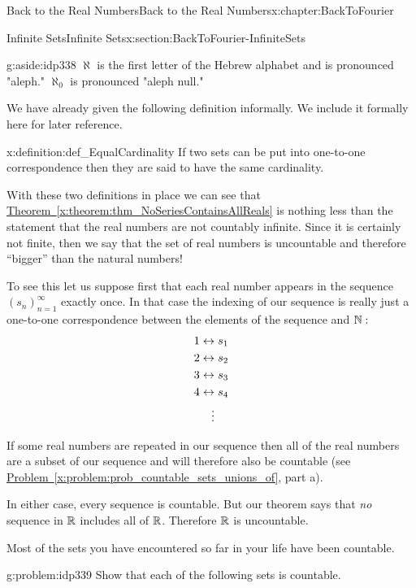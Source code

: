 \begin{chapterptx}{Back to the Real Numbers}{}{Back to the Real Numbers}{}{}{x:chapter:BackToFourier}
\begin{sectionptx}{Infinite Sets}{}{Infinite Sets}{}{}{x:section:BackToFourier-InfiniteSets}
		\begin{aside}{}{g:aside:idp338}%
			\(\aleph{}\) is the first letter of the Hebrew alphabet and is pronounced "aleph." \(\aleph_0\) is pronounced "aleph null."%
		\end{aside}
		We have already given the following definition informally. We include it formally here for later reference.%
		\begin{definition}{}{x:definition:def_EqualCardinality}%
			 If two sets can be put into one-to-one correspondence then they are said to have the \alert{same cardinality}.%
		\end{definition}
		With these two definitions in place we can see that \hyperref[x:theorem:thm_NoSeriesContainsAllReals]{Theorem~{\xreffont\ref{x:theorem:thm_NoSeriesContainsAllReals}}} is nothing less than the statement that the real numbers are not countably infinite. Since it is certainly not finite, then we say that the set of real numbers is uncountable and therefore ``bigger'' than the natural numbers!%
		\par
		To see this let us suppose first that each real number appears in the sequence \((s_n)_{n=1}^\infty\) exactly once. In that case the indexing of our sequence is really just a one-to-one correspondence between the elements of the sequence and \(\mathbb {N}:\)%
		\begin{align*}
			1& \leftrightarrow s_1\\
			2& \leftrightarrow s_2\\
			3& \leftrightarrow s_3\\
			4& \leftrightarrow s_4\\
			& \ \ \ \vdots
		\end{align*}
		\par
		If some real numbers are repeated in our sequence then all of the real numbers are a subset of our sequence and will therefore also be countable (see \hyperref[x:problem:prob_countable_sets_unions_of]{Problem~{\xreffont\ref{x:problem:prob_countable_sets_unions_of}}}, part a).%
		\par
		In either case, every sequence is countable. But our theorem says that \emph{no} sequence in \(\mathbb {R}\) includes all of \(\mathbb {R}\). Therefore \(\mathbb {R}\) is uncountable.%
		\par
		Most of the sets you have encountered so far in your life have been countable.%
		\begin{problem}{}{g:problem:idp339}%
			Show that each of the following sets is countable.%
			\begin{enumerate}[font=\bfseries,label=(\alph*),ref=\alph*]

\end{enumerate}
\end{problem}
\end{sectionptx}
\end{chapterptx}
